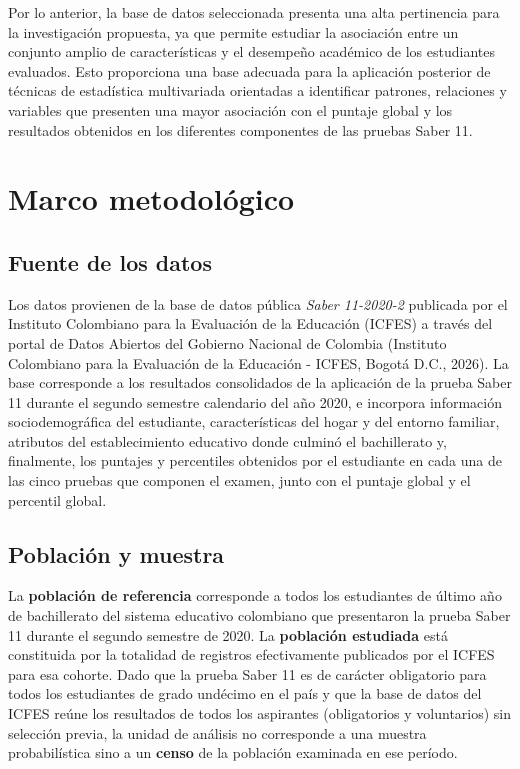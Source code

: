 \documentclass[12pt]{article}
\begin{document}
Por lo anterior, la base de datos seleccionada presenta una alta pertinencia para la investigación propuesta, ya que permite estudiar la asociación entre un conjunto amplio de características y el desempeño académico de los estudiantes evaluados. Esto proporciona una base adecuada para la aplicación posterior de técnicas de estadística multivariada orientadas a identificar patrones, relaciones y variables que presenten una mayor asociación con el puntaje global y los resultados obtenidos en los diferentes componentes de las pruebas Saber 11.

\section{Marco metodológico}

\subsection{Fuente de los datos}

Los datos provienen de la base de datos pública \textit{Saber 11-2020-2} publicada por el Instituto Colombiano para la Evaluación de la Educación (ICFES) a través del portal de Datos Abiertos del Gobierno Nacional de Colombia (Instituto Colombiano para la Evaluación de la Educación - ICFES, Bogotá D.C., 2026). La base corresponde a los resultados consolidados de la aplicación de la prueba Saber 11 durante el segundo semestre calendario del año 2020, e incorpora información sociodemográfica del estudiante, características del hogar y del entorno familiar, atributos del establecimiento educativo donde culminó el bachillerato y, finalmente, los puntajes y percentiles obtenidos por el estudiante en cada una de las cinco pruebas que componen el examen, junto con el puntaje global y el percentil global. 

\subsection{Población y muestra}

La \textbf{población de referencia} corresponde a todos los estudiantes de último año de bachillerato del sistema educativo colombiano que presentaron la prueba Saber 11 durante el segundo semestre de 2020. La \textbf{población estudiada} está constituida por la totalidad de registros efectivamente publicados por el ICFES para esa cohorte. Dado que la prueba Saber 11 es de carácter obligatorio para todos los estudiantes de grado undécimo en el país y que la base de datos del ICFES reúne los resultados de todos los aspirantes (obligatorios y voluntarios) sin selección previa, la unidad de análisis no corresponde a una muestra probabilística sino a un \textbf{censo} de la población examinada en ese período.
\end{document}
